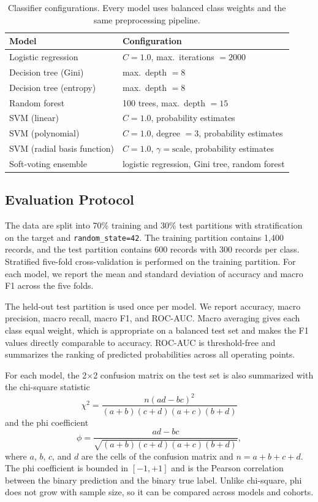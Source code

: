\documentclass[conference]{IEEEtran}
\begin{document}
\begin{table}[!t]
\renewcommand{\arraystretch}{1.15}
\caption{Classifier configurations. Every model uses balanced class weights and the same preprocessing pipeline.}
\label{tab:models}
\centering
\footnotesize
\begin{tabular}{@{}ll@{}}
\hline
Model & Configuration \\
\hline
Logistic regression & \(C=1.0\), max.\ iterations \(=2000\) \\
Decision tree (Gini) & max.\ depth \(=8\) \\
Decision tree (entropy) & max.\ depth \(=8\) \\
Random forest & 100 trees, max.\ depth \(=15\) \\
SVM (linear) & \(C=1.0\), probability estimates \\
SVM (polynomial) & \(C=1.0\), degree \(=3\), probability estimates \\
SVM (radial basis function) & \(C=1.0\), \(\gamma=\text{scale}\), probability estimates \\
Soft-voting ensemble & logistic regression, Gini tree, random forest \\
\hline
\end{tabular}
\end{table}

\subsection{Evaluation Protocol}

The data are split into 70\% training and 30\% test partitions with stratification on the target and \texttt{random\_state=42}. The training partition contains 1,400 records, and the test partition contains 600 records with 300 records per class. Stratified five-fold cross-validation is performed on the training partition. For each model, we report the mean and standard deviation of accuracy and macro F1 across the five folds.

The held-out test partition is used once per model. We report accuracy, macro precision, macro recall, macro F1, and ROC-AUC. Macro averaging gives each class equal weight, which is appropriate on a balanced test set and makes the F1 values directly comparable to accuracy. ROC-AUC is threshold-free and summarizes the ranking of predicted probabilities across all operating points.

For each model, the 2$\times$2 confusion matrix on the test set is also summarized with the chi-square statistic
\begin{equation}
\chi^2 = \frac{n(ad-bc)^2}{(a+b)(c+d)(a+c)(b+d)}
\label{eq:chi2}
\end{equation}
and the phi coefficient
\begin{equation}
\phi = \frac{ad-bc}{\sqrt{(a+b)(c+d)(a+c)(b+d)}},
\label{eq:phi}
\end{equation}
where \(a\), \(b\), \(c\), and \(d\) are the cells of the confusion matrix and \(n=a+b+c+d\). The phi coefficient is bounded in \([-1,+1]\) and is the Pearson correlation between the binary prediction and the binary true label. Unlike chi-square, phi does not grow with sample size, so it can be compared across models and cohorts.
\end{document}
